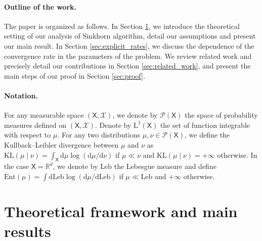 \documentclass[final,12pt]{colt2023} %
\def\msx{\mathsf{X}}
\def\rset{\mathbb{R}}
\newcommand{\cP}{\mathcal{P}}
\newcommand{\De}{\mathrm{d}}
\def\mrl{\mathrm{L}}
\def\rml{\mrl}
\def\rset{\mathbb{R}}
\def\rmd{\mathrm{d}}
\def\Ent{\mathrm{Ent}}
\def\Leb{\mathrm{Leb}}
\begin{document}
\paragraph{Outline of the work.} The paper is organized as follows. In Section \ref{sec:ass_and_res}, we introduce the theoretical setting of our analysis of Sinkhorn algorithm, detail our assumptions and present our main result. In Section \ref{sec:explicit_rates}, we discuss the dependence of the convergence rate in the parameters of the problem. We review related work and precisely detail our contributions in Section \ref{sec:related_work}, and present the main steps of our proof in Section \ref{sec:proof}.


\paragraph{Notation.}For any measurable space $(\msx, \mathcal{X})$, we denote by $\cP(\msx)$ the space of probability measures defined on $(\msx, \mathcal{X})$. 
Denote by $\rml^1 (\msx)$ the set of function integrable with respect to $\mu$. For any two distributions $\mu,\nu \in \cP(\msx)$, we define the Kullback--Leibler divergence between $\mu$ and $\nu$ as  $\mathrm{KL}(\mu \mid \nu)= \int_{\msx} \De \mu \log(\De \mu/\De \nu)$ if $\mu \ll \nu$ and $\mathrm{KL}(\mu \mid \nu)= +\infty$ otherwise. In the case $\msx = \rset^d$, we denote by $\Leb$ the Lebesgue measure and  define $\Ent(\mu) = \int \rmd \Leb \log (\rmd \mu / \rmd \Leb) $ if  $\mu \ll \Leb$ and $+\infty$ otherwise. 

\section{Theoretical framework and main results} \label{sec:ass_and_res}
\end{document}
